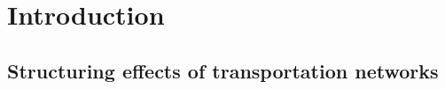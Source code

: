 \documentclass[11pt]{article}
\begin{document}





%
%
%
%
% 
%
%


\section{Introduction}

\subsection{Structuring effects of transportation networks}
\end{document}
